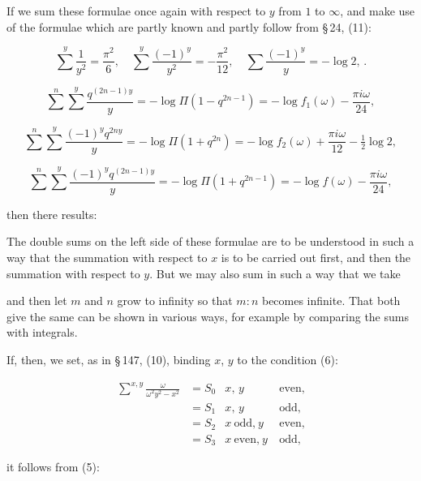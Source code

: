 
If we sum these formulae once again with respect to $y$ from $1$ to
$\infty$, and make use of the formulae which are partly known and
partly follow from \S\,24, (11):

\[
\sum^{y}\frac{1}{y^2}=\frac{\pi^2}{6},\quad
\sum^{y}\frac{(-1)^y}{y^2}=-\frac{\pi^2}{12},\quad
\sum\frac{(-1)^y}{y}=-\log 2,\,.
\]

\[
\sum^{n}\sum^{y}\frac{q^{(2n-1)y}}{y}
=-\log\Pi(1-q^{2n-1})=-\log f_1(\omega)-\frac{\pi i\omega}{24},
\]

\[
\sum^{n}\sum^{y}\frac{(-1)^y q^{2ny}}{y}
=-\log\Pi(1+q^{2n})=-\log f_2(\omega)+\frac{\pi i\omega}{12}-\tfrac{1}{2}\log 2,
\]

\[
\sum^{n}\sum^{y}\frac{(-1)^y q^{(2n-1)y}}{y}
=-\log\Pi(1+q^{2n-1})=-\log f(\omega)-\frac{\pi i\omega}{24},
\]

then there results:


The double sums on the left side of these formulae are to be understood
in such a way that the summation with respect to $x$ is to be carried
out first, and then the summation with respect to $y$. But we may also
sum in such a way that we take


and then let $m$ and $n$ grow to infinity so that $m:n$ becomes
infinite. That both give the same can be shown in various ways, for
example by comparing the sums with integrals.

If, then, we set, as in \S\,147, (10), binding $x$, $y$ to the
condition (6):

\[
\begin{aligned}
\sum^{x,y}\frac{\omega}{\omega^2y^2-x^2}&=S_0 & x,\,y&\ \text{even,}\\
&=S_1 & x,\,y&\ \text{odd,}\\
&=S_2 & x\ \text{odd,}\ y&\ \text{even,}\\
&=S_3 & x\ \text{even,}\ y&\ \text{odd,}
\end{aligned}
\]

it follows from (5):
